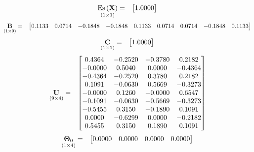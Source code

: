 \documentclass{glimmpse-report}
\begin{document}
\begin{eqnarray*}
\underset{\left(1\times1\right)}{\text{Es}\left(\mathbf{X}\right)} & = & \begin{bmatrix}1.0000\protect\\
\end{bmatrix}
\end{eqnarray*}
\begin{eqnarray*}
\underset{\left(1\times9\right)}{\mathbf{B}} & = & \begin{bmatrix}0.1133 & 0.0714 & -0.1848 & -0.1848 & 0.1133 & 0.0714 & 0.0714 & -0.1848 & 0.1133\protect\\
\end{bmatrix}
\end{eqnarray*}
\begin{eqnarray*}
\underset{\left(1\times1\right)}{\mathbf{C}} & = & \begin{bmatrix}1.0000\protect\\
\end{bmatrix}
\end{eqnarray*}
\begin{eqnarray*}
\underset{\left(9\times4\right)}{\mathbf{U}} & = & \begin{bmatrix}0.4364 & -0.2520 & -0.3780 & 0.2182\protect\\
-0.0000 & 0.5040 & 0.0000 & -0.4364\protect\\
-0.4364 & -0.2520 & 0.3780 & 0.2182\protect\\
0.1091 & -0.0630 & 0.5669 & -0.3273\protect\\
-0.0000 & 0.1260 & -0.0000 & 0.6547\protect\\
-0.1091 & -0.0630 & -0.5669 & -0.3273\protect\\
-0.5455 & 0.3150 & -0.1890 & 0.1091\protect\\
0.0000 & -0.6299 & 0.0000 & -0.2182\protect\\
0.5455 & 0.3150 & 0.1890 & 0.1091\protect\\
\end{bmatrix}
\end{eqnarray*}
\begin{eqnarray*}
\underset{\left(1\times4\right)}{\mathbf{\Theta}_0} & = & \begin{bmatrix}0.0000 & 0.0000 & 0.0000 & 0.0000\protect\\
\end{bmatrix}
\end{eqnarray*}
\end{document}
